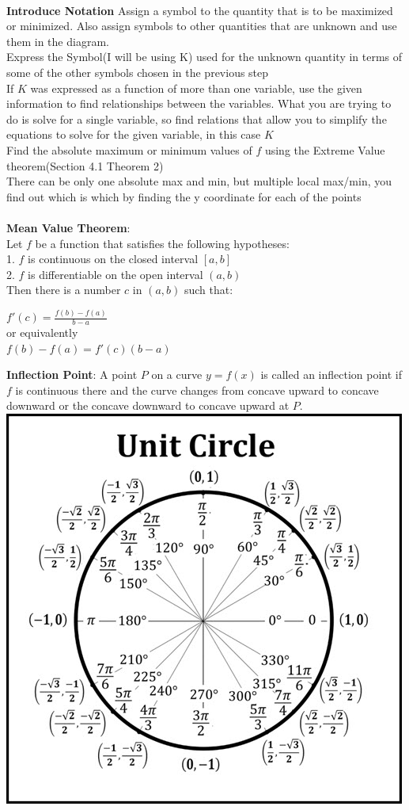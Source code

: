 \documentclass[10pt,a4paper]{article}
\begin{document}
\\	\textbf{Introduce Notation} Assign a symbol to the quantity that is to be maximized or minimized. Also assign symbols to other quantities that are unknown and use them in the diagram.
\\	Express the Symbol(I will be using K) used for the unknown quantity in terms of some of the other symbols chosen in the previous step
\\	If $K$ was expressed as a function of more than one variable, use the given information to find relationships between the variables. What you are trying to do is solve for a single variable, so find relations that allow you to simplify the equations to solve for the given variable, in this case $K$
\\	Find the absolute maximum or minimum values of $f$ using the Extreme Value theorem(Section 4.1 Theorem 2)
\\ There can be only one absolute max and min, but multiple local max/min, you find out which is which by finding the y coordinate for each of the points
\\
\\	\textbf{Mean Value Theorem}:
\\Let $f$ be a function that satisfies the following hypotheses:
\\1. $f$ is continuous on the closed interval $[a,b]$
\\2. $f$ is differentiable on the open interval $(a,b)$
\\ Then there is a number $c$ in $(a,b)$ such that:
\begin{center}
	$f'(c)= \frac{f(b)-f(a)}{b-a}$
	\\or equivalently
	\\$f(b)-f(a) = f'(c)(b-a)$
\end{center}
	\textbf{Inflection Point}: A point $P$ on a curve $y=f(x)$ is called an inflection point if $f$ is continuous there and the curve changes from concave upward to concave downward or the concave downward to concave upward at $P$.
\\ \includegraphics{unitcircle.jpg}	
\end{document}
